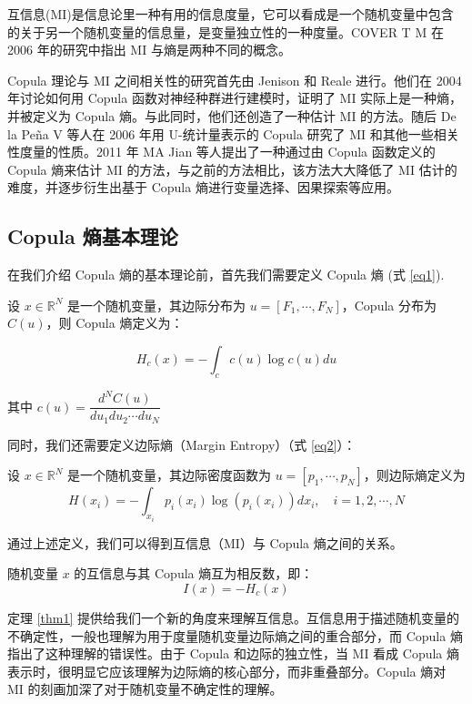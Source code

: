 \documentclass[a4paper]{ctexart}
\begin{document}
互信息(MI)是信息论里一种有用的信息度量，它可以看成是一个随机变量中包含的关于另一个随机变量的信息量，是变量独立性的一种度量。COVER T\cite{ref3} M 在 2006 年的研究中指出 MI 与熵是两种不同的概念。

Copula 理论与 MI 之间相关性的研究首先由 Jenison 和 Reale\cite{ref4} 进行。他们在 2004 年讨论如何用 Copula 函数对神经种群进行建模时，证明了  MI 实际上是一种熵，并被定义为 Copula 熵。与此同时，他们还创造了一种估计 MI 的方法。随后 De la Pe\~na V\cite{ref5} 等人在 2006 年用 U-统计量表示的 Copula 研究了 MI 和其他一些相关性度量的性质。2011 年 MA Jian\cite{ref6} 等人提出了一种通过由 Copula 函数定义的 Copula 熵来估计 MI 的方法，与之前的方法相比，该方法大大降低了 MI 估计的难度，并逐步衍生出基于 Copula 熵进行变量选择、因果探索等应用。

\subsection{Copula 熵基本理论}
在我们介绍 Copula 熵的基本理论前，首先我们需要定义 Copula 熵 (式 \ref{eq1}).
\begin{definition}
设 $x\in\mathbb{R}^N$ 是一个随机变量，其边际分布为 $u = [F_1,\cdots,F_N]$，Copula 分布为 $C(u)$，则 Copula 熵定义为：

\begin{equation}
	H_c (x) =  -\int_c c(u)\log c(u) du
	\label{eq1}
\end{equation}

其中 	$c(u) = \dfrac{d^N C(u) }{du_1du_2\cdots du_N}$
\end{definition}

同时，我们还需要定义边际熵（Margin Entropy）（式 \ref{eq2}）：
\begin{definition}
设 $x\in\mathbb{R}^N$ 是一个随机变量，其边际密度函数为 $u = [p_1,\cdots,p_N]$，则边际熵定义为
\begin{equation}
	\label{eq2}
	H(x_i) = -\int_{x_i}p_i(x_i)\log(p_i(x_i))dx_i,\quad i = 1,2,\cdots,N
\end{equation}
\end{definition}

通过上述定义，我们可以得到互信息（MI）与 Copula 熵之间的关系。
\begin{theorem}
	\label{thm1}
	随机变量 $x$ 的互信息与其 Copula 熵互为相反数，即：
	\begin{equation}
	I(x) = - H_c(x)
\end{equation}
\end{theorem}

定理 \ref{thm1} 提供给我们一个新的角度来理解互信息。互信息用于描述随机变量的不确定性，一般也理解为用于度量随机变量边际熵之间的重合部分，而 Copula 熵指出了这种理解的错误性。由于 Copula 和边际的独立性，当 MI 看成 Copula 熵表示时，很明显它应该理解为边际熵的核心部分，而非重叠部分。Copula 熵对 MI 的刻画加深了对于随机变量不确定性的理解。
\end{document}
